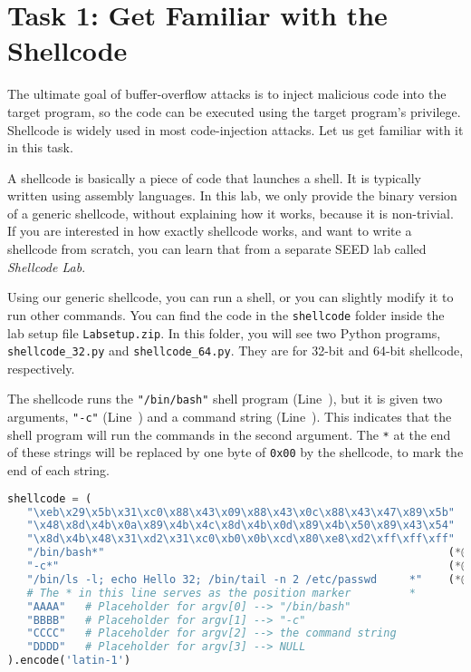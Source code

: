 






\section{Task 1: Get Familiar with the Shellcode}

The ultimate goal of buffer-overflow attacks is to inject
malicious code into the target program, so the code can be
executed using the target program's privilege.
Shellcode is widely used in most code-injection attacks.
Let us get familiar with it in this task.


A shellcode is basically a piece of code that launches a shell.
It is typically written using assembly languages.  
In this lab, we only provide the binary version of a generic shellcode,
without explaining how it works, because it is non-trivial. 
If you are interested in how exactly shellcode works, and 
want to write a shellcode from scratch, you 
can learn that from a separate SEED lab called \textit{Shellcode Lab}.


Using our generic shellcode, you can run a shell, 
or you can slightly modify it 
to run other commands. You can find the code 
in the \texttt{shellcode} folder inside the lab setup file \texttt{Labsetup.zip}.
In this folder, you will see two Python programs, 
\texttt{shellcode\_32.py} and \texttt{shellcode\_64.py}. 
They are for 32-bit and 64-bit shellcode, respectively. 


The shellcode runs the \texttt{"/bin/bash"} shell program (Line~), 
but it is given two arguments, \texttt{"-c"} (Line~) and 
a command string (Line~). This indicates that the shell program
will run the commands in the second argument. 
The \texttt{*} at the end of these strings will be replaced by 
one byte of \texttt{0x00} by the shellcode, to mark 
the end of each string. 

\begin{lstlisting}[language=python]
shellcode = (
   "\xeb\x29\x5b\x31\xc0\x88\x43\x09\x88\x43\x0c\x88\x43\x47\x89\x5b"
   "\x48\x8d\x4b\x0a\x89\x4b\x4c\x8d\x4b\x0d\x89\x4b\x50\x89\x43\x54"
   "\x8d\x4b\x48\x31\xd2\x31\xc0\xb0\x0b\xcd\x80\xe8\xd2\xff\xff\xff"
   "/bin/bash*"                                                     (*@\ding{202}@*)
   "-c*"                                                            (*@\ding{203}@*)
   "/bin/ls -l; echo Hello 32; /bin/tail -n 2 /etc/passwd     *"    (*@\ding{204}@*)
   # The * in this line serves as the position marker         *
   "AAAA"   # Placeholder for argv[0] --> "/bin/bash"              
   "BBBB"   # Placeholder for argv[1] --> "-c"
   "CCCC"   # Placeholder for argv[2] --> the command string
   "DDDD"   # Placeholder for argv[3] --> NULL
).encode('latin-1')
\end{lstlisting}

